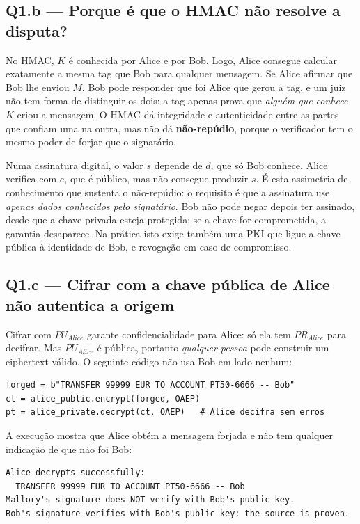 \documentclass[11pt,a4paper]{article}
\begin{document}
\subsection*{Q1.b --- Porque é que o HMAC não resolve a disputa?}

No HMAC, $K$ é conhecida por Alice e por Bob. Logo, Alice consegue calcular
exatamente a mesma tag que Bob para qualquer mensagem. Se Alice afirmar que
Bob lhe enviou $M$, Bob pode responder que foi Alice que gerou a tag, e um
juiz não tem forma de distinguir os dois: a tag apenas prova que
\emph{alguém que conhece $K$} criou a mensagem. O HMAC dá integridade e
autenticidade entre as partes que confiam uma na outra, mas não dá
\textbf{não-repúdio}, porque o verificador tem o mesmo poder de forjar que o
signatário.

Numa assinatura digital, o valor $s$ depende de $d$, que só Bob conhece. Alice
verifica com $e$, que é público, mas não consegue produzir $s$. É esta
assimetria de conhecimento que sustenta o não-repúdio: o requisito é que a
assinatura use \emph{apenas dados conhecidos pelo signatário}. Bob não pode
negar depois ter assinado, desde que a chave privada esteja protegida; se a
chave for comprometida, a garantia desaparece. Na prática isto exige também
uma PKI que ligue a chave pública à identidade de Bob, e revogação em caso de
compromisso.

\subsection*{Q1.c --- Cifrar com a chave pública de Alice não autentica a origem}

Cifrar com $PU_{Alice}$ garante confidencialidade para Alice: só ela tem
$PR_{Alice}$ para decifrar. Mas $PU_{Alice}$ é pública, portanto
\emph{qualquer pessoa} pode construir um ciphertext válido. O seguinte código
não usa Bob em lado nenhum:

\begin{verbatim}
forged = b"TRANSFER 99999 EUR TO ACCOUNT PT50-6666 -- Bob"
ct = alice_public.encrypt(forged, OAEP)
pt = alice_private.decrypt(ct, OAEP)   # Alice decifra sem erros
\end{verbatim}

A execução mostra que Alice obtém a mensagem forjada e não tem qualquer
indicação de que não foi Bob:

\begin{verbatim}
Alice decrypts successfully:
  TRANSFER 99999 EUR TO ACCOUNT PT50-6666 -- Bob
Mallory's signature does NOT verify with Bob's public key.
Bob's signature verifies with Bob's public key: the source is proven.
\end{verbatim}
\end{document}
